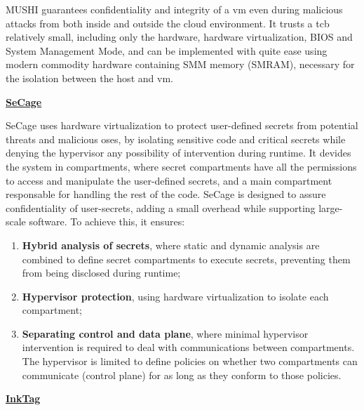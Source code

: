 MUSHI guarantees confidentiality and integrity of a \gls{vm} even during malicious attacks from both inside and outside the cloud environment.
It trusts a \gls{tcb} relatively small, including only the hardware, hardware virtualization, BIOS and System Management Mode, and can be implemented with quite ease using modern commodity hardware containing SMM memory (SMRAM), necessary for the isolation between the host and \gls{vm}.\newline


\underline{\textbf{SeCage}}

SeCage \cite{SeCagePaper} uses hardware virtualization to protect user-defined secrets from potential threats and malicious \gls{os}es, by isolating sensitive code and critical secrets while denying the hypervisor any possibility of intervention during runtime.
It devides the system in compartments, where secret compartments have all the permissions to access and manipulate the user-defined secrets, and a main compartment responsable for handling the rest of the code.
SeCage is designed to assure confidentiality of user-secrets, adding a small overhead while supporting large-scale software. To achieve this, it ensures:
\begin{enumerate}
	\item \textbf{Hybrid analysis of secrets}, where static and dynamic analysis are combined to define secret compartments to execute secrets, preventing them from being disclosed during runtime;
	\item \textbf{Hypervisor protection}, using hardware virtualization to isolate each compartment;
	\item \textbf{Separating control and data plane}, where minimal hypervisor intervention is required to deal with communications between compartments. The hypervisor is limited to define policies on whether two compartments can communicate (control plane) for as long as they conform to those policies.\newline
\end{enumerate}



\underline{\textbf{InkTag}}

